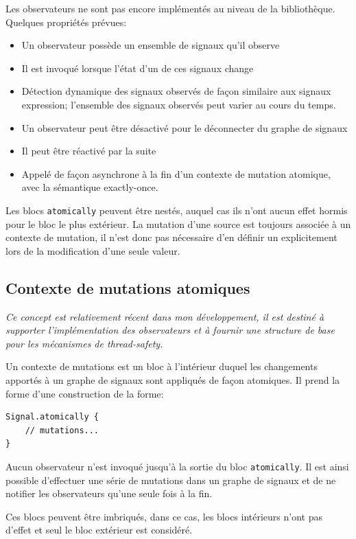 {\itshape

Les observateurs ne sont pas encore implémentés au niveau de la bibliothèque. Quelques propriétés prévues:
\begin{itemize}
	\item Un observateur possède un ensemble de signaux qu'il observe
	\item Il est invoqué lorsque l'état d'un de ces signaux change
	\item Détection dynamique des signaux observés de façon similaire aux signaux expression; l'ensemble des signaux observés peut varier au cours du temps.
	\item Un observateur peut être désactivé pour le déconnecter du graphe de signaux
	\item Il peut être réactivé par la suite
	\item Appelé de façon asynchrone à la fin d'un contexte de mutation atomique, avec la sémantique exactly-once.
\end{itemize}



Les blocs \texttt{atomically} peuvent être nestés, auquel cas ils n'ont aucun effet hormis pour le bloc le plus extérieur. La mutation d'une source est toujours associée à un contexte de mutation, il n'est donc pas nécessaire d'en définir un explicitement lors de la modification d'une seule valeur.

}

\subsection{Contexte de mutations atomiques}
\textit{Ce concept est relativement récent dans mon développement, il est destiné à supporter l'implémentation des observateurs et à fournir une structure de base pour les mécanismes de thread-safety.}

Un contexte de mutations est un bloc à l'intérieur duquel les changements apportés à un graphe de signaux sont appliqués de façon atomiques. Il prend la forme d'une construction de la forme:
\begin{lstlisting}
Signal.atomically {
	// mutations...
}
\end{lstlisting}

Aucun observateur n'est invoqué jusqu'à la sortie du bloc \texttt{atomically}. Il est ainsi possible d'effectuer une série de mutations dans un graphe de signaux et de ne notifier les observateurs qu'une seule fois à la fin.

Ces blocs peuvent être imbriqués, dans ce cas, les blocs intérieurs n'ont pas d'effet et seul le bloc extérieur est considéré.

